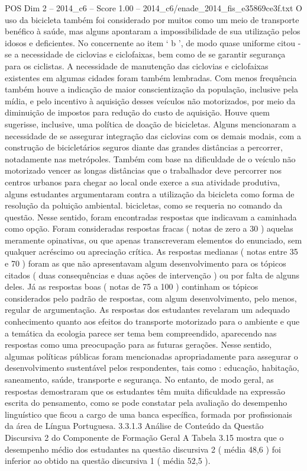 \begin{textsample}{POS Dim 2 – 2014\_c6 – Score 1.00 – 2014\_c6/enade\_2014\_fis\_e35869ce3f.txt}
O uso da bicicleta também foi considerado por muitos como um meio de transporte benéfico à saúde, mas alguns apontaram a impossibilidade de sua utilização pelos idosos e deficientes.
No concernente ao item ‘ b ’, de modo quase uniforme citou -se a necessidade de ciclovias e ciclofaixas, bem como de se garantir segurança para os ciclistas.
A necessidade de manutenção das ciclovias e ciclofaixas existentes em algumas cidades foram também lembradas.
Com menos frequência também houve a indicação de maior conscientização da população, inclusive pela mídia, e pelo incentivo à aquisição desses veículos não motorizados, por meio da diminuição de impostos para redução do custo de aquisição.
Houve quem sugerisse, inclusive, uma política de doação de bicicletas.
Alguns mencionaram a necessidade de se assegurar integração das ciclovias com os demais modais, com a construção de bicicletários seguros diante das grandes distâncias a percorrer, notadamente nas metrópoles.
Também com base na dificuldade de o veículo não motorizado vencer as longas distâncias que o trabalhador deve percorrer nos centros urbanos para chegar ao local onde exerce a sua atividade produtiva, alguns estudantes argumentaram contra a utilização da bicicleta como forma de resolução da poluição ambiental. bicicletas, como se requeria no comando da questão.
Nesse sentido, foram encontradas respostas que indicavam a caminhada como opção.
Foram consideradas respostas fracas ( notas de zero a 30 ) aquelas meramente opinativas, ou que apenas transcreveram elementos do enunciado, sem qualquer acréscimo ou apreciação crítica.
As respostas medianas ( notas entre 35 e 70 ) foram as que não apresentavam algum desenvolvimento para os tópicos citados ( duas consequências e duas ações de intervenção ) ou por falta de alguns deles.
Já as respostas boas ( notas de 75 a 100 ) continham os tópicos considerados pelo padrão de respostas, com algum desenvolvimento, pelo menos, regular de argumentação.
As respostas dos estudantes revelaram um adequado conhecimento quanto aos efeitos do transporte motorizado para o ambiente e que a temática da ecologia parece ser tema bem compreendido, aparecendo nas respostas como uma preocupação para as futuras gerações.
Nesse sentido, algumas políticas públicas foram mencionadas apropriadamente para assegurar o desenvolvimento sustentável pelos respondentes, tais como : educação, habitação, saneamento, saúde, transporte e segurança.
No entanto, de modo geral, as respostas demostraram que os estudantes têm muita dificuldade na expressão escrita do pensamento, como se pode constatar pela avaliação do desempenho linguístico que ficou a cargo de uma banca específica, formada por profissionais da área de Língua Portuguesa. 3.3.1.3 Análise de Conteúdo da Questão Discursiva 2 do Componente de Formação Geral A Tabela 3.15 mostra que o desempenho médio dos estudantes na questão discursiva 2 ( média 48,6 ) foi inferior ao obtido na questão discursiva 1 ( média 52,5 ).

\end{textsample}
